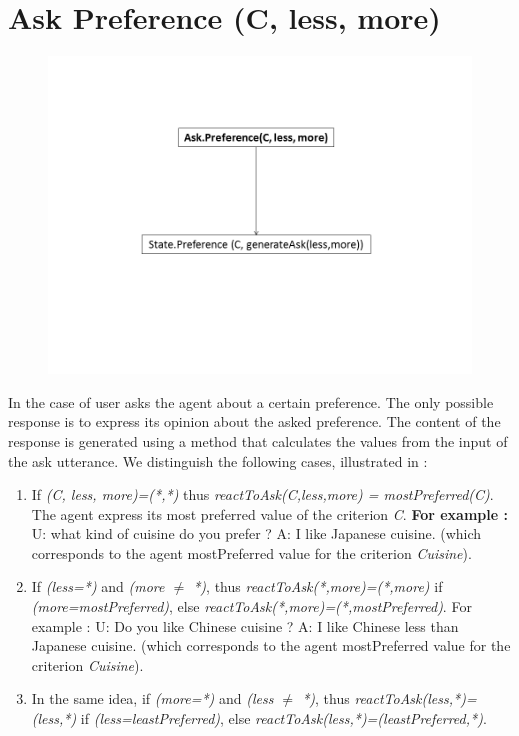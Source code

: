 \documentclass{llncs}
\begin{document}
\section{Ask Preference (C, less, more)}
	\begin{figure}
		\centerline{\includegraphics[width=5in]{utterances/Diapositive1.PNG}}
		\vskip 8pt
	\end{figure}
	\par In the case of user asks the agent about a certain preference. The only possible response is to express its opinion about the asked preference.  The content of the response is generated using a method that calculates the values from the input of the ask utterance. We distinguish the following cases, illustrated in :
		\begin{enumerate}
			\item If \textit{(C, less, more)=(*,*)} thus \textit{reactToAsk(C,less,more) = mostPreferred(C)}. The agent express its most preferred value of the criterion \emph{C}.
				\subitem \textbf{For example :} 
				\subitem U: what kind of cuisine do you prefer ?
				\subitem A: I like Japanese cuisine. (which corresponds to the agent mostPreferred value for the criterion \textit{Cuisine}).
 
			\item  If \textit{(less=*)} and \textit{(more $\not =$ *)}, thus \textit{reactToAsk(*,more)=(*,more) } if \textit{(more=mostPreferred)}, else \textit{reactToAsk(*,more)=(*,mostPreferred)}.
			\subitem For example : 
				\subitem U: Do you like Chinese cuisine ?
				\subitem A: I like Chinese less than Japanese cuisine. (which corresponds to the agent mostPreferred value for the criterion \textit{Cuisine}).
			\item In the same idea, if \textit{(more=*)} and \textit{(less $\not =$ *)}, thus \textit{reactToAsk(less,*)=(less,*)} if \textit{(less=leastPreferred)}, else \textit{reactToAsk(less,*)=(leastPreferred,*)}.
			
		\end{enumerate}
\end{document}

